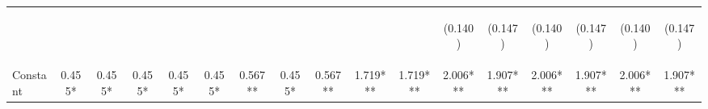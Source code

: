 \begin{center}
\begin{tabular}{lcccccccccccccccc}
\vspace{4pt} & \begin{footnotesize}\end{footnotesize} & \begin{footnotesize}\end{footnotesize} & \begin{footnotesize}\end{footnotesize} & \begin{footnotesize}\end{footnotesize} & \begin{footnotesize}\end{footnotesize} & \begin{footnotesize}\end{footnotesize} & \begin{footnotesize}\end{footnotesize} & \begin{footnotesize}\end{footnotesize} & \begin{footnotesize}\end{footnotesize} & \begin{footnotesize}\end{footnotesize} & \begin{footnotesize}(0.140)\end{footnotesize} & \begin{footnotesize}(0.147)\end{footnotesize} & \begin{footnotesize}(0.140)\end{footnotesize} & \begin{footnotesize}(0.147)\end{footnotesize} & \begin{footnotesize}(0.140)\end{footnotesize} & \begin{footnotesize}(0.147)\end{footnotesize} \\
Constant & 0.455* & 0.455* & 0.455* & 0.455* & 0.455* & 0.567** & 0.455* & 0.567** & 1.719*** & 1.719*** & 2.006*** & 1.907*** & 2.006*** & 1.907*** & 2.006*** & 1.907*** \\

\end{tabular}
\end{center}
